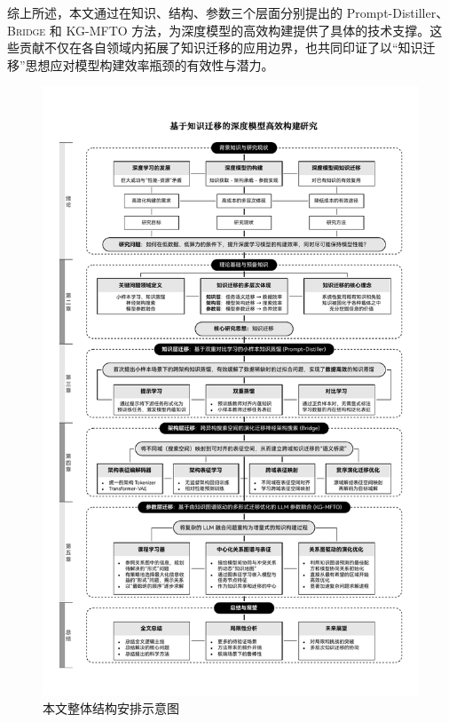 \documentclass[../main.tex]{subfiles}
\begin{document}
综上所述，本文通过在知识、结构、参数三个层面分别提出的 Prompt-Distiller、\textsc{Bridge} 和 KG-MFTO 方法，为深度模型的高效构建提供了具体的技术支撑。这些贡献不仅在各自领域内拓展了知识迁移的应用边界，也共同印证了以“知识迁移”思想应对模型构建效率瓶颈的有效性与潜力。

\label{sec:organization-of-the-thesis}

\begin{figure}[t]
	\centering
	\includegraphics[width=\linewidth]{overall_struction.pdf}
	\caption{本文整体结构安排示意图}\label{fig:overall_structure}
\end{figure}
\end{document}
